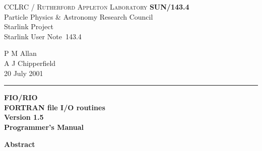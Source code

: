 \documentclass[twoside,11pt]{article}
\newcommand{\stardoccategory}  {Starlink User Note}
\newcommand{\stardocinitials}  {SUN}
\newcommand{\stardocnumber}    {143.4}
\newcommand{\stardocauthors}   {P M Allan \\ A J Chipperfield}
\newcommand{\stardocdate}      {20 July 2001}
\newcommand{\stardoctitle}     {FIO/RIO \\ [1ex]
                                FORTRAN file I/O routines}
\newcommand{\stardocversion}   {Version 1.5}
\newcommand{\stardocmanual}    {Programmer's Manual}
\newcommand{\stardocname}{\stardocinitials /\stardocnumber}
\newenvironment{latexonly}{}{}
\renewcommand{\_}{\texttt{\symbol{95}}}
\begin{document}
\thispagestyle{empty}

\begin{latexonly}
   CCLRC / \textsc{Rutherford Appleton Laboratory} \hfill \textbf{\stardocname}\\
   {\large Particle Physics \& Astronomy Research Council}\\
   {\large Starlink Project\\}
   {\large \stardoccategory\ \stardocnumber}
   \begin{flushright}
   \stardocauthors\\
   \stardocdate
   \end{flushright}
   \vspace{-4mm}
   \rule{\textwidth}{0.5mm}
   \vspace{5mm}
   \begin{center}
   {\Huge\textbf{\stardoctitle \\ [2.5ex]}}
   {\LARGE\textbf{\stardocversion \\ [4ex]}}
   {\Huge\textbf{\stardocmanual}}
   \end{center}
   \vspace{5mm}


   \vspace{10mm}
   \begin{center}
      {\Large\textbf{Abstract}}
   \end{center}
\end{latexonly}
\end{document}
